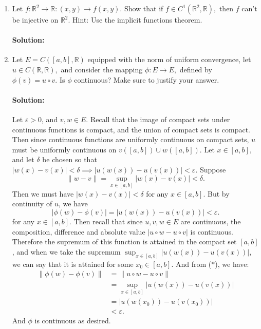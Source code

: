\documentclass{article}
\begin{document}
\begin{enumerate}
\item  Let $f:\mathbb{R}^2\to\mathbb{R}:(x,y)\to f(x,y).$ Show that if $f\in C^1(\mathbb{R}^2,\mathbb{R}),$ then $f$ can't be injective on $\mathbb{R}^2.$ Hint: Use the implicit functions theorem.
    \paragraph{Solution: }

\item  Let $E=C([a,b],\mathbb{R})$ equipped with the norm of uniform convergence, let $u\in C(\mathbb{R},\mathbb{R}),$ and consider the mapping $\phi:E\to E,$ defined by $\phi(v)=u\circ v.$ Is $\phi$ continuous? Make sure to justify your answer.

    \paragraph{Solution: } Let $\varepsilon>0$, and $v,w\in E$. Recall that the image of compact sets under continuous functions is compact, and the union of compact sets is compact. Then since continuous functions are uniformly continuous on compact sets, $u$ must be uniformly continuous on $v([a,b])\cup w([a,b])$. Let $x\in [a,b]$, and let $\delta$ be chosen so that $|w(x)-v(x)|<\delta\implies|u(w(x))-u(v(x))|<\varepsilon$. 
    Suppose
    \[
        \|w-v\|= \sup_{x\in [a,b]}|w(x)-v(x)| <\delta \tag{$*$}
    .\] 
    Then we must have $|w(x)-v(x)|<\delta$ for any $x\in [a,b]$. But by continuity of $u$, we have 
    \[ |\phi(w)-\phi(v)|=|u(w(x))-u(v(x))|<\varepsilon .\] 
    for any $x\in [a,b]$. Then recall that since $u,v,w\in E$ are continuous, the composition, difference and absolute value $|u\circ w-u\circ v|$ is continuous. Therefore the supremum of this function is attained in the compact set $[a,b]$, and when we take the supremum $\sup_{x\in [a,b]}|u(w(x))-u(v(x))|$, we can say that it is attained for some $x_0\in [a,b]$. And from ($*$), we have:
    \begin{align*}
        \|\phi(w)-\phi(v)\|&=\|u\circ w-u\circ v\|\\
                           &=\sup_{x\in [a,b]}|u(w(x))-u(v(x))|\\
                           &=|u(w(x_0))-u(v(x_0))|\\
                           &<\varepsilon
    .\end{align*}
    And $\phi$ is continuous as desired.


\end{enumerate}
\end{document}
